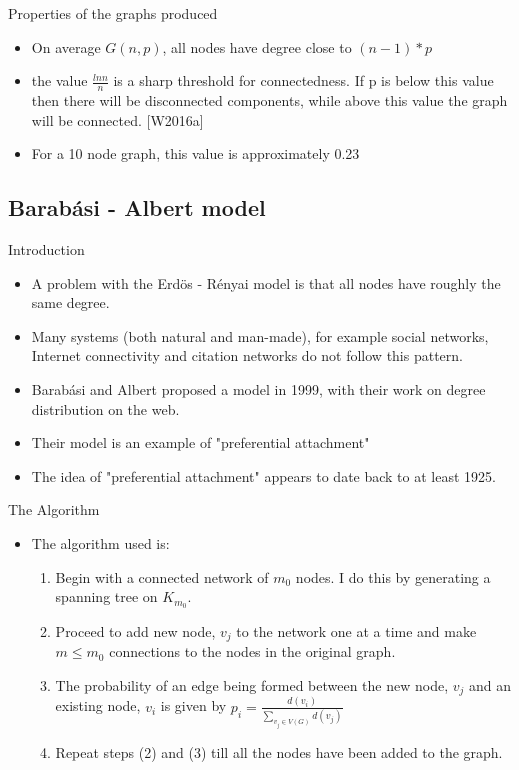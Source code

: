 \documentclass{beamer}
\begin{document}
\begin{frame}{Properties of the graphs produced}
\begin{itemize}
\item On average $G(n,p)$, all nodes have degree close to $(n-1)*p$
\item the value $\frac{ln n}{n}$ is a sharp threshold for connectedness. If p is below this value then there will be disconnected components,
while above this value the graph will be connected. [W2016a]
\item For a 10 node graph, this value is approximately 0.23 
\end{itemize}
\end{frame}

\subsection{Barab\'asi - Albert model}

\begin{frame}{Introduction}
\begin{itemize}
\item A problem with the Erd\"os - R\'enyai model is that all nodes have roughly the same degree.  
\item Many systems (both natural and man-made), for example social networks, Internet connectivity and citation networks do not follow this pattern.
\item Barab\'asi and Albert proposed a model in 1999, with their work on degree distribution on the web.
\item Their model is an example of "preferential attachment"
\item The idea of "preferential attachment" appears to date back to at least 1925.
\end{itemize}
\end{frame}

\begin{frame}{The Algorithm}
\begin{itemize}
\item The algorithm used is:
\begin{enumerate}
\item Begin with a connected network of $m_0$ nodes.  I do this by generating a spanning tree on $K_{m_0}$.
\item Proceed to add new node, $v_j$ to the network one at a time and make $m \leq m_0$ connections to the nodes in the original graph.
\item The probability of an edge being formed between the new node, $v_j$ and an existing node, $v_i$ is given by $p_i = \frac{d(v_i)}{\sum_{v_j \in V(G)}d(v_j)}$
\item Repeat steps (2) and (3) till all the nodes have been added to the graph.
\end{enumerate}
\end{itemize}
\end{frame}
\end{document}
